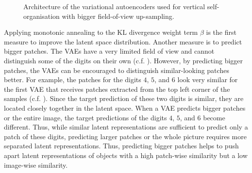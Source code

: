 \begin{figure}[h]
{
}
    \caption[Architecture of the VAEs with bigger field-of-view up-sampling]{Architecture of the variational autoencoders used for vertical self-organisation with bigger field-of-view up-sampling.}
\end{figure}
Applying monotonic annealing to the KL divergence weight term $\beta$ is the first measure to improve the latent space distribution.
Another measure is to predict bigger patches.
The VAEs have a very limited field of view and cannot distinguish some of the digits on their own (c.f. ).
However, by predicting bigger patches, the VAEs can be encouraged to distinguish similar-looking patches better.
For example, the patches for the digits $4$, $5$, and $6$ look very similar for the first VAE that receives patches extracted from the top left corner of the samples (c.f. ).
Since the target prediction of these two digits is similar, they are located closely together in the latent space.
When a VAE predicts bigger patches or the entire image, the target predictions of the digits $4$, $5$, and $6$ become different. Thus, while similar latent representations are sufficient to predict only a patch of these digits, predicting larger patches or the whole picture requires more separated latent representations.
Thus, predicting bigger patches helps to push apart latent representations of objects with a high patch-wise similarity but a low image-wise similarity.


